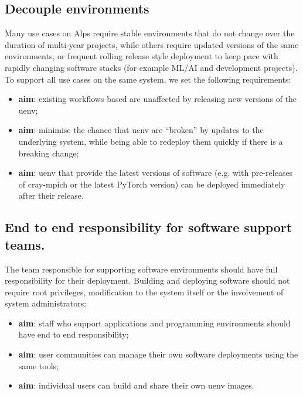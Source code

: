 \subsection{Decouple environments}

Many use cases on Alps require stable environments that do not change over the duration of multi-year projects,
while others require updated versions of the same environments, or frequent rolling release style deployment to keep pace with rapidly changing software stacks (for example ML/AI and development projects).
To support all use cases on the same system, we set the following requirements:
\begin{itemize}
    \item \textbf{aim}: existing workflows based are unaffected by releasing new versions of the uenv;
    \item \textbf{aim}: minimise the chance that uenv are ``broken'' by updates to the underlying system, while being able to redeploy them quickly if there is a breaking change;
    \item \textbf{aim}: uenv that provide the latest versions of software (e.g. with pre-releases of cray-mpich or the latest PyTorch version) can be deployed immediately after their release.
\end{itemize}

\subsection{End to end responsibility for software support teams.}
\label{sec:objective-e2e}

The team responsible for supporting software environments should have full responsibility for their deployment.
Building and deploying software should not require root privileges, modification to the system itself or the involvement of system administrators:
\begin{itemize}
    \item \textbf{aim}: staff who support applications and programming environments should have end to end responsibility;
    \item \textbf{aim}: user communities can manage their own software deployments using the same tools;
    \item \textbf{aim}: individual users can build and share their own uenv images.
\end{itemize}
